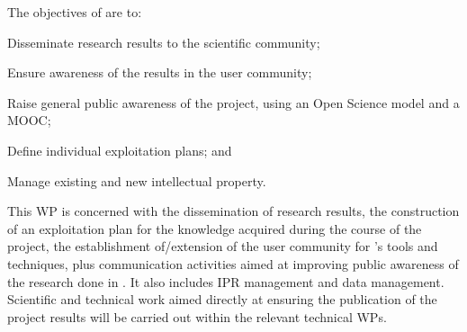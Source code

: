 \addtocounter{wpno}{1}
\begin{Workpackage}{\thewpno}
\WPTitle{\wpname{\thewpno}}

\begin{WPObjectives}
The objectives of \theWP{} are to:
\begin{compactitem}
  \item Disseminate research results to the scientific community;
  \item Ensure awareness of the results in the user community;
  \item Raise general public awareness of the \TheProject{} project, using an Open Science model and a MOOC;
  \item Define individual exploitation plans;
  and
  \item Manage existing and new intellectual property.
\end{compactitem}
\end{WPObjectives}

\begin{WPDescription}
This WP is concerned with the dissemination of research results, the construction of an exploitation plan for the knowledge acquired during the course of the \TheProject{} project, 
the establishment of/extension of the user community for \TheProject{}'s tools and techniques,
plus communication activities aimed at improving public awareness of the research done in \TheProject{}.
It also includes IPR management and data management.
Scientific and technical work aimed directly at ensuring the publication of the project results will be carried out within the relevant technical WPs.
\end{WPDescription}

\begin{Task}


\end{Task}
\end{Workpackage}
